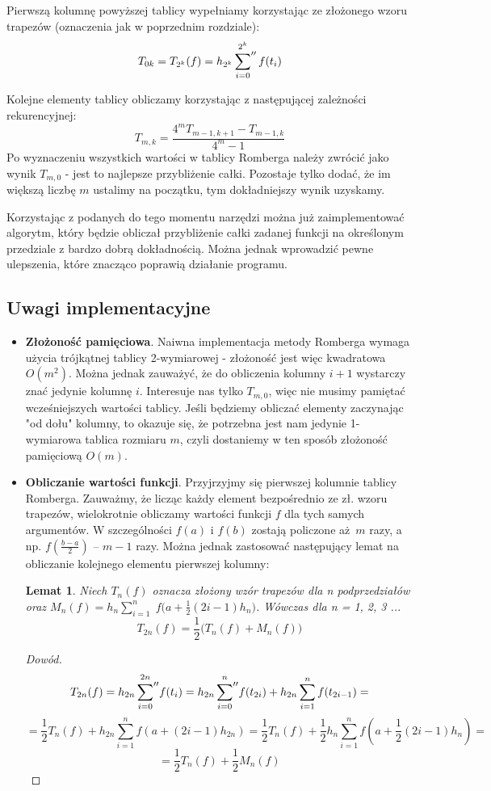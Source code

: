 \documentclass[a4paper,10pt]{article}
\newtheorem*{lemma*}{Lemat}
\begin{document}
 Pierwszą kolumnę powyższej tablicy wypełniamy korzystając ze złożonego wzoru trapezów (oznaczenia jak w poprzednim rozdziale): 
 \[  T_{0k} = T_{2^k}(f) = h_{2^k} \sideset{}{''}\sum_{i=0}^{2^k} f(t_i)\]
 
 Kolejne elementy tablicy obliczamy korzystając z następującej zależności rekurencyjnej:
 \[ T_{m,k} = \frac{4^mT_{m-1,k+1} - T_{m-1,k}}{4^m - 1} \]
 Po wyznaczeniu wszystkich wartości w tablicy Romberga należy zwrócić jako wynik $T_{m,0}$ - jest to najlepsze przybliżenie całki.  
 Pozostaje tylko dodać, że im większą liczbę $m$ ustalimy na początku, tym dokładniejszy wynik uzyskamy. 
 
 \vspace{5mm} %
 
 Korzystając z podanych do tego momentu narzędzi można już zaimplementować algorytm, który będzie obliczał przybliżenie całki zadanej funkcji na określonym przedziale z bardzo dobrą dokładnością. Można jednak wprowadzić pewne ulepszenia, które znacząco poprawią działanie programu.
    \subsection{Uwagi implementacyjne}
    \begin{itemize}
     \item \textbf{Złożoność pamięciowa}. Naiwna implementacja metody Romberga wymaga użycia trójkątnej tablicy 2-wymiarowej - złożoność jest więc kwadratowa $O(m^2)$. Można jednak zauważyć, że do obliczenia kolumny $i+1$ wystarczy znać jedynie kolumnę $i$. Interesuje nas tylko $T_{m,0}$, więc nie musimy pamiętać wcześniejszych wartości tablicy. Jeśli będziemy obliczać elementy zaczynając "od dołu" kolumny, to okazuje się, że potrzebna jest nam jedynie 1-wymiarowa tablica rozmiaru $m$, czyli dostaniemy w ten sposób złożoność pamięciową $O(m)$.
     
     \item \textbf{Obliczanie wartości funkcji}. Przyjrzyjmy się pierwszej kolumnie tablicy Romberga. Zauważmy, że licząc każdy element bezpośrednio ze zł. wzoru trapezów, wielokrotnie obliczamy wartości funkcji $f$ dla tych samych argumentów. W szczególności $f(a)$ i $f(b)$ zostają policzone aż $m$ razy, a np. $f(\frac{b-a}{2})$ -- $m-1$  razy. Można jednak zastosować następujący lemat na obliczanie kolejnego elementu pierwszej kolumny:
     \begin{lemma*}
      Niech $T_n(f)$ oznacza złożony wzór trapezów dla n podprzedziałów oraz $M_n(f) = h_n\displaystyle{\sum_{i=1}^n}\;f\big(a+\frac{1}{2}(2i-1)h_n\big)$. Wówczas dla n = 1, 2, 3 ...
      \[ T_{2n}(f) = \frac{1}{2}\big(T_n(f) + M_n(f)\big) \]
     \end{lemma*}
        \begin{proof}[Dowód]
         \[ T_{2n}(f) = h_{2n}\displaystyle{\sideset{}{''}\sum_{i=0}^{2n}}f(t_i) = h_{2n}\displaystyle{\sideset{}{''}\sum_{i=0}^{n}}f(t_{2i}) + h_{2n}\sum_{i=1}^nf(t_{2i-1}) = \]
         \[ = \frac{1}{2}T_n(f) + h_{2n}\sum_{i=1}^nf(a+(2i-1)h_{2n}) = \frac{1}{2}T_n(f) + \frac{1}{2}h_n\sum_{i=1}^nf(a+\frac{1}{2}(2i-1)h_{n}) = \]
         \[ = \frac{1}{2}T_n(f) + \frac{1}{2}M_n(f) \]
        \end{proof}
    \end{itemize}
\end{document}
